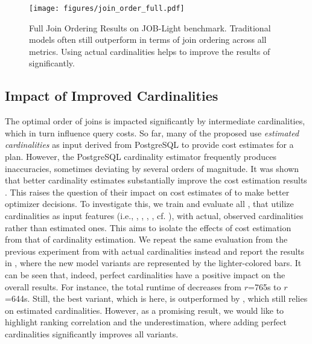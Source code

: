 \begin{figure*}
    \centering
\texttt{[image: figures/join\_order\_full.pdf]}
    \caption{Full Join Ordering Results on JOB-Light benchmark. 
    Traditional models often still outperform \lcms in terms of join ordering across all metrics.
    Using actual cardinalities helps to improve the results of \lcms significantly.}
    \label{fig:join_order_act_cards}
\end{figure*}

\subsection{Impact of Improved Cardinalities}
The optimal order of joins is impacted significantly by intermediate cardinalities, which in turn influence query costs. 
So far, many of the proposed \lcms use \textit{estimated cardinalities} as input derived from PostgreSQL to provide cost estimates for a plan. 
However, the PostgreSQL cardinality estimator frequently produces inaccuracies, sometimes deviating by several orders of magnitude. 
It was shown that better cardinality estimates substantially improve the cost estimation results \cite{leis_how_2015}. 
This raises the question of their impact on cost estimates of \lcms to make better optimizer decisions. 
To investigate this, we train and evaluate all \lcms, that utilize cardinalities as input features (i.e., \flatvector, \qppnet, \zeroshot, \dace, cf. ), with actual, observed cardinalities rather than estimated ones.
This aims to isolate the effects of cost estimation from that of cardinality estimation.
We repeat the same evaluation from the previous experiment from  with actual cardinalities instead and report the results in , where the new model variants are represented by the lighter-colored bars.
It can be seen that, indeed, perfect cardinalities have a positive impact on the overall results.
For instance, the total runtime of \qppnet decreases from $r$=765s to $r$=644s.
Still, the best \lcm variant, which is \flatvector here, is outperformed by \postgresx, which still relies on estimated cardinalities.
However, as a promising result, we would like to highlight ranking correlation and the underestimation, where adding perfect cardinalities significantly improves all \lcm variants.

